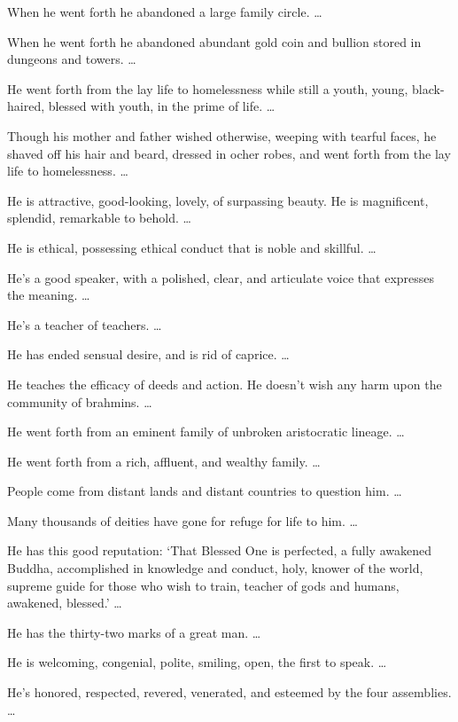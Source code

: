 \documentclass[12pt,openany]{book}%
\begin{document}
When he went forth he abandoned a large family circle. … 

When he went forth he abandoned abundant gold coin and bullion stored in dungeons and towers. … 

He went forth from the lay life to homelessness while still a youth, young, black-haired, blessed with youth, in the prime of life. … 

Though his mother and father wished otherwise, weeping with tearful faces, he shaved off his hair and beard, dressed in ocher robes, and went forth from the lay life to homelessness. … 

He is attractive, good-looking, lovely, of surpassing beauty. He is magnificent, splendid, remarkable to behold. … 

He is ethical, possessing ethical conduct that is noble and skillful. … 

He’s a good speaker, with a polished, clear, and articulate voice that expresses the meaning. … 

He’s a teacher of teachers. … 

He has ended sensual desire, and is rid of caprice. … 

He teaches the efficacy of deeds and action. He doesn’t wish any harm upon the community of brahmins. … 

He went forth from an eminent family of unbroken aristocratic lineage. … 

He went forth from a rich, affluent, and wealthy family. … 

People come from distant lands and distant countries to question him. … 

Many thousands of deities have gone for refuge for life to him. … 

He has this good reputation: ‘That Blessed One is perfected, a fully awakened Buddha, accomplished in knowledge and conduct, holy, knower of the world, supreme guide for those who wish to train, teacher of gods and humans, awakened, blessed.’ … 

He has the thirty-two marks of a great man. … 

He is welcoming, congenial, polite, smiling, open, the first to speak. … 

He’s honored, respected, revered, venerated, and esteemed by the four assemblies. … 
\end{document}

